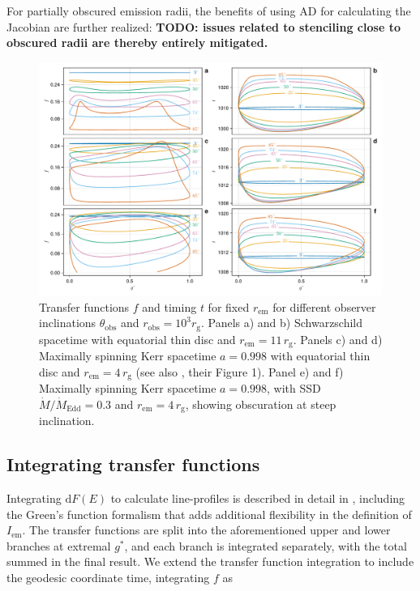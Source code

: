 \documentclass[fleqn,usenatbib]{mnras}
\newcommand{\todo}[1]{{\noindent \bf \color{red} TODO: #1}}
\renewcommand{\d}{\text{d}}
\newcommand{\rg}{r_\text{g}}
\begin{document}
For partially obscured emission radii, the benefits of using AD for calculating the Jacobian are further realized: \todo{issues related to stenciling close to obscured radii are thereby entirely mitigated.}


\begin{figure}
    \centering
    \includegraphics[width=0.99\linewidth]{figures/transfer-functions.plots.pdf}
    \caption{Transfer functions $f$ and timing $t$ for fixed $r_\text{em}$ for different observer inclinations $\theta_\text{obs}$ and $r_\text{obs} = 10^3 \rg$. Panels a) and b) Schwarzschild spacetime with equatorial thin disc and $r_\text{em} = 11\, \rg$. Panels c) and d) Maximally spinning Kerr spacetime $a=0.998$ with equatorial thin disc and $r_\text{em} = 4 \, \rg$ (see also \citealp{bambi_testing_2017}, their Figure 1). Panel e) and f) Maximally spinning Kerr spacetime $a=0.998$, with SSD $\dot{M} / \dot{M}_\text{Edd} = 0.3$ and $r_\text{em} = 4\, \rg$, showing obscuration at steep inclination.}
    \label{fig:transfer-functions}
\end{figure}

\subsection{Integrating transfer functions}
\label{sec:transfer-function-integration}

Integrating $\d F(E)$ to calculate line-profiles is described in detail in \cite{dauser_broad_2010}, including the Green's function formalism that adds additional flexibility in the definition of $I_\text{em}$. The transfer functions are split into the aforementioned upper and lower branches at extremal $g^\ast$, and each branch is integrated separately, with the total summed in the final result. We extend the transfer function integration to include the geodesic coordinate time, integrating $f$ as
\end{document}
